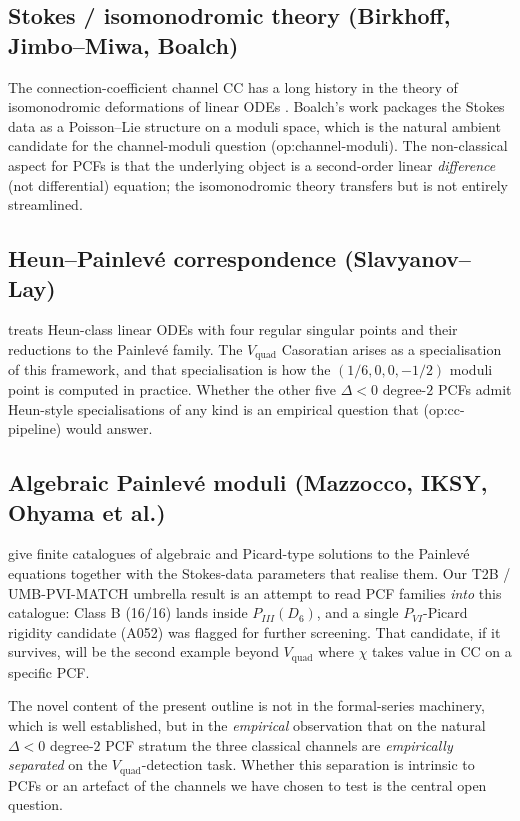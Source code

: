 \documentclass[11pt,reqno]{amsart}
\theoremstyle{plain}
\theoremstyle{definition}
\theoremstyle{remark}
\newcommand{\CC}{\mathrm{CC}}
\newcommand{\Vquad}{V_{\mathrm{quad}}}
\begin{document}
\subsection{Stokes / isomonodromic theory
(Birkhoff, Jimbo--Miwa, Boalch)}
The connection-coefficient channel $\CC$ has a long history
in the theory of isomonodromic deformations of linear ODEs
\cite{jimbomiwa1981monodromy, vanderputsinger2003galois}.
Boalch's work \cite{boalch2001stokes} packages the Stokes
data as a Poisson--Lie structure on a moduli space, which is
the natural ambient candidate for the channel-moduli question
\textsf{(op:channel-moduli)}. The non-classical aspect for
PCFs is that the underlying object is a second-order linear
\emph{difference} (not differential) equation; the
isomonodromic theory transfers but is not entirely
streamlined.

\subsection{Heun--Painlev\'e correspondence
(Slavyanov--Lay)}
\cite{slavyanov2000special} treats Heun-class linear ODEs
with four regular singular points and their reductions to
the Painlev\'e family. The $\Vquad$ Casoratian arises as a
specialisation of this framework, and that specialisation is
how the $(1/6, 0, 0, -1/2)$ moduli point is computed in
practice. Whether the other five $\Delta < 0$ degree-$2$ PCFs
admit Heun-style specialisations of any kind is an empirical
question that \textsf{(op:cc-pipeline)} would answer.

\subsection{Algebraic Painlev\'e moduli
(Mazzocco, IKSY, Ohyama et al.)}
\cite{mazzocco2001picard, mazzocco2002painleve, iwasaki1991from,
ohyama2006studies, guzzetticlass2012} give finite catalogues of
algebraic and Picard-type solutions to the Painlev\'e
equations together with the Stokes-data parameters that
realise them. Our T2B / UMB-PVI-MATCH umbrella result
\cite{siarc_t2b_v3} is an attempt to read PCF families
\emph{into} this catalogue: Class B (16/16) lands inside
$P_{III}(D_6)$, and a single $P_{VI}$-Picard rigidity
candidate (A052) was flagged for further screening. That
candidate, if it survives, will be the second example
beyond $\Vquad$ where $\chi$ takes value in $\CC$ on a
specific PCF.

\medskip
The novel content of the present outline is not in the
formal-series machinery, which is well established, but in
the \emph{empirical} observation that on the natural
$\Delta < 0$ degree-$2$ PCF stratum the three classical
channels are \emph{empirically separated} on the
$\Vquad$-detection task. Whether this separation is
intrinsic to PCFs or an artefact of the channels we have
chosen to test is the central open question.
\end{document}
